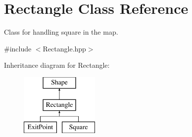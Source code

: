 \hypertarget{class_rectangle}{}\section{Rectangle Class Reference}
\label{class_rectangle}


Class for handling square in the map.  




{\ttfamily \#include $<$Rectangle.\+hpp$>$}

Inheritance diagram for Rectangle\+:\begin{figure}[H]
\begin{center}
\leavevmode
\includegraphics[height=3.000000cm]{class_rectangle}
\end{center}
\end{figure}
